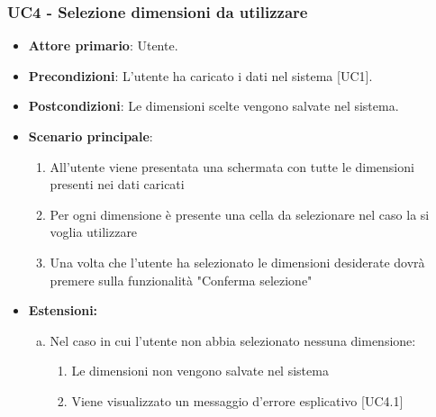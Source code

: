 \subsubsection{UC4 - Selezione dimensioni da utilizzare}
\begin{itemize}
	\item \textbf{Attore primario}: Utente.
	\item \textbf{Precondizioni}: L'utente ha caricato i dati nel sistema [UC1].
	\item \textbf{Postcondizioni}: Le dimensioni scelte vengono salvate nel sistema.
	\item \textbf{Scenario principale}:
		\begin{enumerate}
			\item All'utente viene presentata una schermata con tutte le dimensioni presenti nei dati caricati
			\item Per ogni dimensione è presente una cella da selezionare nel caso la si voglia utilizzare 
			\item Una volta che l'utente ha selezionato le dimensioni desiderate dovrà premere sulla funzionalità "Conferma selezione"
		\end{enumerate}
	\item \textbf{Estensioni:}
		\begin{enumerate}[(a)]
			\item Nel caso in cui l'utente non abbia selezionato nessuna dimensione:
			\begin{enumerate}[(1.)]
				\item Le dimensioni non vengono salvate nel sistema
				\item Viene visualizzato un messaggio d'errore esplicativo [UC4.1]
			\end{enumerate}
		\end{enumerate}
\end{itemize}